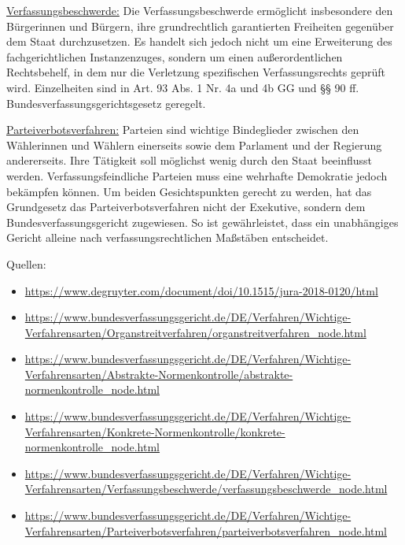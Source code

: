 \documentclass{article}
\begin{document}
\begin{enumerate}[label=(\alph*)]
		\underline{Verfassungsbeschwerde:} Die Verfassungsbeschwerde ermöglicht insbesondere den Bürgerinnen und Bürgern, ihre grundrechtlich garantierten Freiheiten gegenüber dem Staat durchzusetzen. Es handelt sich jedoch nicht um eine Erweiterung des fachgerichtlichen Instanzenzuges, sondern um einen außerordentlichen Rechtsbehelf, in dem nur die Verletzung spezifischen Verfassungsrechts geprüft wird. Einzelheiten sind in Art. 93 Abs. 1 Nr. 4a und 4b GG und §§ 90 ff. Bundesverfassungsgerichtsgesetz geregelt. 
		
		\underline{Parteiverbotsverfahren:} Parteien sind wichtige Bindeglieder zwischen den Wählerinnen und Wählern einerseits sowie dem Parlament und der Regierung andererseits. Ihre Tätigkeit soll möglichst wenig durch den Staat beeinflusst werden. Verfassungsfeindliche Parteien muss eine wehrhafte Demokratie jedoch bekämpfen können. Um beiden Gesichtspunkten gerecht zu werden, hat das Grundgesetz das Parteiverbotsverfahren nicht der Exekutive, sondern dem Bundesverfassungsgericht zugewiesen. So ist gewährleistet, dass ein unabhängiges Gericht alleine nach verfassungsrechtlichen Maßstäben entscheidet.
	\end{enumerate}

	Quellen:
	\begin{itemize}
		\item \url{https://www.degruyter.com/document/doi/10.1515/jura-2018-0120/html}
		\item \url{https://www.bundesverfassungsgericht.de/DE/Verfahren/Wichtige-Verfahrensarten/Organstreitverfahren/organstreitverfahren_node.html}
		\item \url{https://www.bundesverfassungsgericht.de/DE/Verfahren/Wichtige-Verfahrensarten/Abstrakte-Normenkontrolle/abstrakte-normenkontrolle_node.html}
		\item \url{https://www.bundesverfassungsgericht.de/DE/Verfahren/Wichtige-Verfahrensarten/Konkrete-Normenkontrolle/konkrete-normenkontrolle_node.html}
		\item \url{https://www.bundesverfassungsgericht.de/DE/Verfahren/Wichtige-Verfahrensarten/Verfassungsbeschwerde/verfassungsbeschwerde_node.html}
		\item \url{https://www.bundesverfassungsgericht.de/DE/Verfahren/Wichtige-Verfahrensarten/Parteiverbotsverfahren/parteiverbotsverfahren_node.html}
	\end{itemize}
	
\end{document}
